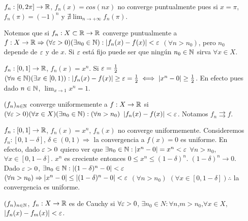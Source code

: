 \begin{eg}
  $f_n: [0, 2\pi] \to \mathbb{R}$, $f_n(x) = cos(nx)$ no converge puntualmente pues si $x = \pi$, $f_n(\pi) = (-1)^n$ y $\nexists \lim_{n \to +\infty} f_n(\pi)$.
\end{eg}

Notemos que si $f_n: X \subset \mathbb{R} \to \mathbb{R}$ converge puntualmente a $f: X \to \mathbb{R} \Rightarrow (\forall \varepsilon > 0)(\exists n_0 \in \mathbb{N}) : |f_n(x) - f(x)| < \varepsilon$ $(\forall n > n_0)$, pero $n_0$ depende de $\varepsilon$ y de $x$. Si $\varepsilon$ está fijo puede ser que ningún $n_0 \in \mathbb{N}$ sirva $\forall x \in X$.

\begin{eg}
  $f_n: [0, 1] \to \mathbb{R}$, $f_n(x) = x^n$. Si $\varepsilon = \frac{1}{2}$ $(\forall n \in \mathbb{N})(\exists x \in [0, 1)) : |f_n(x) - f(x)| \geq \varepsilon = \frac{1}{2} \iff |x^n - 0| \geq \frac{1}{2}$. En efecto pues dado $n \in \mathbb{N}$, $\lim_{x \to 1} x^n = 1$. 
\end{eg}

\begin{definition}
  $(f_n)_{n \in \mathbb{N}}$ converge uniformemente a $f: X \to \mathbb{R}$ si $(\forall \varepsilon > 0)(\forall x \in X)(\exists n_0 \in \mathbb{N}) : (\forall n > n_0)$ $ |f_n(x) - f(x)| < \varepsilon$. Notamos $f_n \rightrightarrows f$.
\end{definition}

\begin{eg}
  $f_n: [0, 1] \to \mathbb{R}$, $f_n(x) = x^n$, $f_n(x)$ no converge uniformemente. Consideremos $f_n: [0, 1 - \delta]$, $\delta \in (0, 1) \Rightarrow$ la convergencia a $f(x) = 0$ es uniforme. En efecto, dado $\varepsilon > 0$ quiero ver que $\exists n_0 \in \mathbb{N} : |x^n - 0| = x^n < \varepsilon$ $\forall n > n_0$, $\forall x \in [0, 1 - \delta]$. $x^n$ es creciente entonces $0 \leq x^n \leq (1-\delta)^n$. $(1-\delta)^n \to 0$. Dado $\varepsilon > 0$, $\exists n_0 \in \mathbb{N} : | (1-\delta)^n - 0 | < \varepsilon$ $(\forall n > n_0) \Rightarrow |x^n - 0| \leq |(1-\delta)^n - 0| < \varepsilon$ $(\forall n > n_0)$ $(\forall x \in [0, 1-\delta]) \therefore$ la convergencia es uniforme.  
\end{eg}

\begin{definition}
  $(f_n)_{n \in \mathbb{N}}$, $f_n: X \to \mathbb{R}$ es de Cauchy si $\forall \varepsilon > 0$, $\exists n_0 \in N : \forall n$,$m > n_0$,$\forall x \in X$, $|f_n(x) - f_m(x)| < \varepsilon$.
\end{definition}

